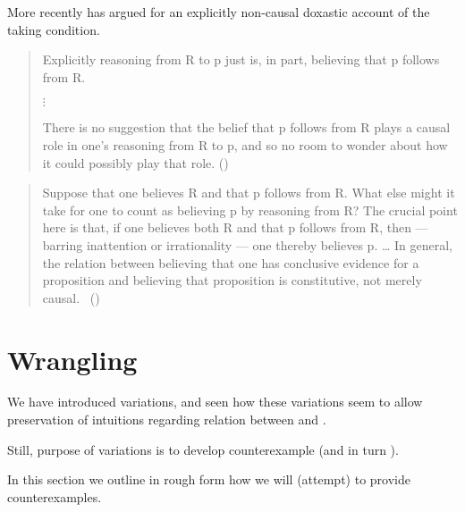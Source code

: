 \begin{note}
  More recently \cite{Valaris:2014un} has argued for an explicitly non-causal doxastic account of the taking condition.

  \begin{quote}
    Explicitly reasoning from R to p just is, in part, believing that p follows from R.

    \mbox{}\hfill\(\vdots\)\hfill\mbox{}

    There is no suggestion that the belief that p follows from R plays a causal role in one’s reasoning from R to p, and so no room to wonder about how it could possibly play that role.\nolinebreak
    \mbox{}\hfill\mbox{(\citeyear[117--118]{Valaris:2014un})}
  \end{quote}

  \begin{quote}
    Suppose that one believes R and that p follows from R.
    What else might it take for one to count as believing p by reasoning from R?
    The crucial point here is that, if one believes both R and that p follows from R, then — barring inattention or irrationality — one thereby believes p.
    \dots
    In general, the relation between believing that one has conclusive evidence for a proposition and believing that proposition is constitutive, not merely causal.%
    \mbox{ }\hfill\mbox{(\citeyear[110 ]{Valaris:2014un})}
  \end{quote}
\end{note}


\section{Wrangling}
\label{cha:clar:sec:wrangling}
\label{cha:clar:sec:support-qWhy}
\label{cha:clar:expand:qWhy}

\begin{note}
  We have introduced variations, and seen how these variations seem to allow preservation of intuitions regarding relation between \qWhy{} and \qHow{}.

  Still, purpose of variations is to develop counterexample \issueConstraint{} (and in turn \issueInclusion{}).

  In this section we outline in rough form how we will (attempt) to provide counterexamples.
\end{note}

